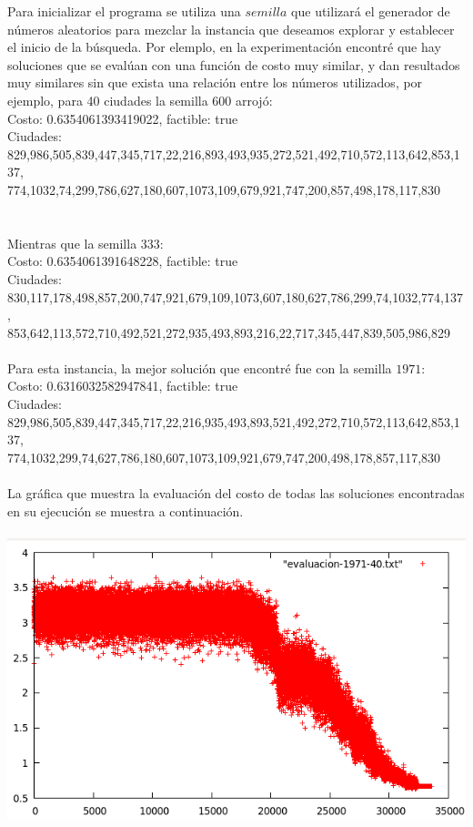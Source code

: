 \documentclass[a4paper]{article}
\begin{document}
Para inicializar el programa se utiliza una $semilla$ que utilizará el generador de números aleatorios para mezclar la instancia que deseamos explorar y establecer el inicio de la búsqueda.
Por elemplo, en la experimentación encontré que hay soluciones que se evalúan con una función de costo muy similar, y dan resultados muy similares sin que exista una relación entre los números utilizados, por ejemplo, para 40 ciudades la semilla $600$ arrojó:\\
Costo: 0.6354061393419022, factible: true \\
Ciudades:\\
829,986,505,839,447,345,717,22,216,893,493,935,272,521,492,710,572,113,642,853,137,\\774,1032,74,299,786,627,180,607,1073,109,679,921,747,200,857,498,178,117,830\\
\\
\\
Mientras que la semilla $333$:\\
Costo: 0.6354061391648228, factible: true\\
Ciudades:
830,117,178,498,857,200,747,921,679,109,1073,607,180,627,786,299,74,1032,774,137,\\853,642,113,572,710,492,521,272,935,493,893,216,22,717,345,447,839,505,986,829\\
\\
Para esta instancia, la mejor solución que encontré fue con la semilla $1971$:\\
Costo: 0.6316032582947841, factible: true\\
Ciudades:
829,986,505,839,447,345,717,22,216,935,493,893,521,492,272,710,572,113,642,853,137,\\774,1032,299,74,627,786,180,607,1073,109,921,679,747,200,498,178,857,117,830\\
\\
La gráfica que muestra la evaluación del costo de todas las soluciones encontradas en su ejecución se muestra a continuación.\\
\\
\includegraphics[width=\textwidth]{graficas/grafica-1971-40.png}\\
\end{document}
